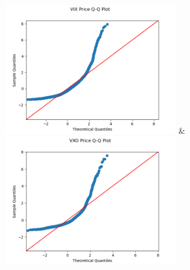 \documentclass[12pt, a4paper]{article}
\theoremstyle{definition}
\begin{document}
\begin{table}[H]
\begin{tabu}
\includegraphics[width=75mm]{VIX Price Q-Q Plot.png} &\includegraphics[width=75mm]{VXO Price Q-Q Plot.png} \\
	\end{tabu}
\end{table} 
\end{document}
